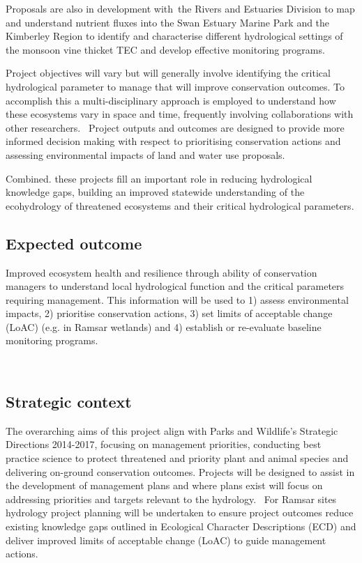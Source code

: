 \documentclass[version=last, 
    paper=a4, %
    10pt, %
    usenames,
    dvipsnames, 
    oneside, %
    headings=openany, %
    DIV=15 %
]{scrbook}
\begin{document}
Proposals are also in development with~the Rivers and Estuaries Division
to map and understand nutrient fluxes into the Swan Estuary Marine Park
and the Kimberley Region to identify and characterise different
hydrological settings of the monsoon vine thicket TEC and develop
effective monitoring programs.

Project objectives will vary but will generally involve identifying the
critical hydrological parameter to manage that will improve conservation
outcomes. To accomplish this a multi-disciplinary approach is employed
to understand how these ecosystems vary in space and time, frequently
involving collaborations with other researchers.~ Project outputs and
outcomes are designed to provide more informed decision making with
respect to prioritising conservation actions and assessing environmental
impacts of land and water use proposals.

Combined. these projects fill an important role in reducing hydrological
knowledge gaps, building an improved statewide understanding of the
ecohydrology of threatened ecosystems and their critical hydrological
parameters.



\subsection*{Expected outcome}
Improved ecosystem health and resilience through ability of conservation
managers to understand local hydrological function and the critical
parameters requiring management. This information will be used to 1)
assess environmental impacts, 2) prioritise conservation actions, 3) set
limits of acceptable change (LoAC) (e.g. in Ramsar wetlands) and 4)
establish or re-evaluate baseline monitoring programs.

~



\subsection*{Strategic context}
The overarching aims of this project align with Parks and Wildlife's
Strategic Directions 2014-2017, focusing on management priorities,
conducting best practice science to protect threatened and priority
plant and animal species and delivering on-ground conservation outcomes.
Projects will be designed to assist in the development of management
plans and where plans exist will focus on addressing priorities and
targets relevant to the hydrology.~ For Ramsar sites hydrology project
planning will be undertaken to ensure project outcomes reduce existing
knowledge gaps outlined in Ecological Character Descriptions (ECD) and
deliver improved limits of acceptable change (LoAC) to guide management
actions.
\end{document}
